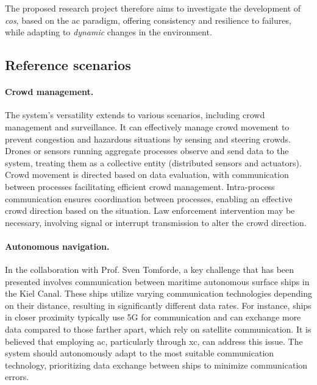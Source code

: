 \documentclass[12pt, a4paper]{article}
\begin{document}
The proposed research project therefore aims to investigate the development of \emph{\ac{cos}},
based on the \ac{ac} paradigm,
offering consistency and resilience to failures,
while adapting to \emph{dynamic} changes in the environment.

\subsection{Reference scenarios}
\label{subsec:example-applications}

\sloppypar
\paragraph{Crowd management.}

The system's versatility extends to various scenarios,
including crowd management and surveillance.
%
It can effectively manage crowd movement to prevent congestion and hazardous situations by sensing and steering crowds.
%
Drones or sensors running aggregate processes observe and send data to the system,
treating them as a collective entity (distributed sensors and actuators).
%
Crowd movement is directed based on data evaluation,
with communication between processes facilitating efficient crowd management.
%
Intra-process communication ensures coordination between processes, enabling an effective crowd direction based on the situation.
%
Law enforcement intervention may be necessary,
involving signal or interrupt transmission to alter the crowd direction.

\sloppypar
\paragraph{Autonomous navigation.}
In the collaboration with Prof. Sven Tomforde,
a key challenge that has been presented involves communication between maritime autonomous surface ships in the Kiel Canal.
%
These ships utilize varying communication technologies depending on their distance,
resulting in significantly different data rates.
%
For instance,
ships in closer proximity typically use 5G for communication and can exchange more data compared to those farther apart,
which rely on satellite communication.
%
It is believed that employing \ac{ac}, particularly through \ac{xc}, can address this issue.
%
The system should autonomously adapt to the most suitable communication technology,
prioritizing data exchange between ships to minimize communication errors.
\end{document}
